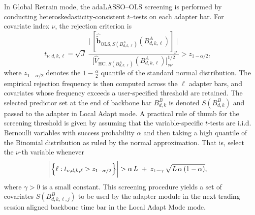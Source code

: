 \documentclass[10pt,a4paper,oneside]{article}
\DeclarePairedDelimiter{\aval}{\lvert}{\rvert} %
\providecommand{\DIFaddtex}[1]{{\protect\color{blue} \sf #1}} %
\providecommand{\DIFdeltex}[1]{{\protect\color{red} \scriptsize #1}} %
\providecommand{\DIFaddbegin}{} %
\providecommand{\DIFaddend}{} %
\providecommand{\DIFdelbegin}{} %
\providecommand{\DIFdelend}{} %
\providecommand{\DIFadd}[1]{\texorpdfstring{\DIFaddtex{#1}}{#1}} %
\providecommand{\DIFdel}[1]{\texorpdfstring{\DIFdeltex{#1}}{}} %
\newcommand{\DIFscaledelfig}{0.5}
\newlength{\DIFdelgraphicswidth} %
\newlength{\DIFdelgraphicsheight} %
\newcommand{\DIFaddincludegraphics}[2][]{{\color{blue}\fbox{\DIFOincludegraphics[#1]{#2}}}} %
\newcommand{\DIFdelincludegraphics}[2][]{%
\sbox{\DIFdelgraphicsbox}{\DIFOincludegraphics[#1]{#2}}%
\settoboxwidth{\DIFdelgraphicswidth}{\DIFdelgraphicsbox} %
\settoboxtotalheight{\DIFdelgraphicsheight}{\DIFdelgraphicsbox} %
\scalebox{\DIFscaledelfig}{%
\parbox[b]{\DIFdelgraphicswidth}{\usebox{\DIFdelgraphicsbox}\\[-\baselineskip] \rule{\DIFdelgraphicswidth}{0em}}\llap{\resizebox{\DIFdelgraphicswidth}{\DIFdelgraphicsheight}{%
\setlength{\unitlength}{\DIFdelgraphicswidth}%
\begin{picture}(1,1)%
\thicklines\linethickness{2pt} %
{\color[rgb]{1,0,0}\put(0,0){\framebox(1,1){}}}%
{\color[rgb]{1,0,0}\put(0,0){\line( 1,1){1}}}%
{\color[rgb]{1,0,0}\put(0,1){\line(1,-1){1}}}%
\end{picture}%
}\hspace*{3pt}}} %
} %
\DeclareRobustCommand{\DIFaddbegin}{\DIFOaddbegin \let\includegraphics\DIFaddincludegraphics} %
\DeclareRobustCommand{\DIFaddend}{\DIFOaddend \let\includegraphics\DIFOincludegraphics} %
\DeclareRobustCommand{\DIFdelbegin}{\DIFOdelbegin \let\includegraphics\DIFdelincludegraphics} %
\DeclareRobustCommand{\DIFdelend}{\DIFOaddend \let\includegraphics\DIFOincludegraphics} %
\begin{document}
In Global Retrain mode, the adaLASSO–OLS screening is performed by conducting heteroskedasticity‐consistent \(t\)–tests on each adapter bar.  For covariate index \(\nu\), the rejection criterion is
\[
    t_{\nu,d,k,\ell} = \sqrt{J}\;
    \frac{\bigl|\,[\hat{\tilde{\mathbf b}}_{\mathrm{OLS},S(B^A_{d,k,\ell})}(B^A_{d,k,\ell})]_{\nu}\bigr|}{\bigl[\hat V_{\mathrm{HC},\,S(B^A_{d,k,\ell})}(B^A_{d,k,\ell})\bigr]_{\nu\nu}^{1/2}}
    > z_{1-\alpha/2},
\]
where \(z_{1-\alpha/2}\) denotes the \(1-\tfrac\alpha2\) quantile of the standard normal distribution.  The empirical rejection frequency is then computed across the \(\ell\) adapter bars, and covariates whose frequency exceeds a user‐specified threshold are retained.  The selected predictor set at the end of backbone bar \(B^B_{d,k}\) is denoted \(S(B^B_{d,k})\) and passed to the adapter in Local Adapt mode.  A practical rule of thumb for the screening threshold is  given by assuming that the variable-specific \(t\)-tests are i.i.d. Bernoulli variables with success probability $\alpha$ and then taking a high quantile of the Binomial distribution as ruled by the normal approximation. That is, select the $\nu$-th variable whenever
\[
    \aval*{ \left\{\ell : t_{\nu,d,k,\ell} > z_{1 - \alpha/2}\right\}} > \alpha\,L \;+\; z_{1-\gamma}\,\sqrt{L\,\alpha\,(1-\alpha)},
\]
where \(\gamma>0\) is a small constant. This screening procedure yields a set of covariates $S\left( B^B_{d,k,\ell,j} \right)$ to be used by the adapter module in the next trading session aligned backbone time bar in the Local Adapt \DIFdelbegin \DIFdel{Mode}\DIFdelend \DIFaddbegin \DIFadd{mode}\DIFaddend .

\end{document}
